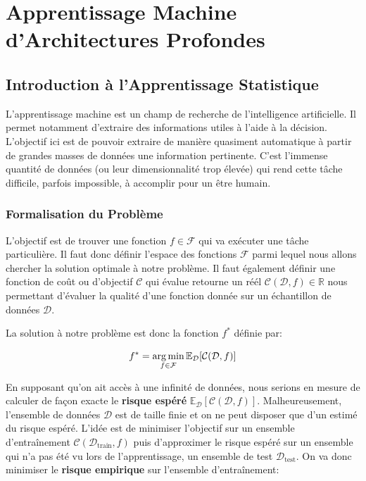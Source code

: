 \chapter{Apprentissage Machine d'Architectures Profondes}


\section{Introduction à l'Apprentissage Statistique}

L'apprentissage machine est un champ de recherche de l'intelligence
artificielle. Il permet notamment d'extraire des informations utiles à l'aide à
la décision.  L'objectif ici est de pouvoir extraire de manière quasiment
automatique à partir de grandes masses de données une information pertinente.
C'est l'immense quantité de données (ou leur dimensionnalité trop élevée)  qui
rend cette tâche difficile, parfois impossible, à accomplir pour un être
humain.


\subsection{Formalisation du Problème}

L'objectif est de trouver une fonction $f\in\mathcal{F}$ qui va exécuter une
tâche particulière. Il faut donc définir l'espace des fonctions $\mathcal{F}$
parmi lequel nous allons chercher la solution optimale à notre problème.  Il
faut également définir une fonction de coût ou d'objectif $\mathcal{C}$ qui
évalue retourne un réél $\mathcal{C}(\mathcal{D},f)\in\mathbb{R}$ nous
permettant d'évaluer la qualité d'une fonction donnée sur un échantillon de
données $\mathcal{D}$.

La solution à notre problème est donc la fonction $f^*$ définie par:

\begin{equation}
\label{eq:graal}
f^* = \operatorname*{arg\,min}_{f \in \mathcal{F}} {\mathbb E}_\mathcal{D}[\mathcal{C}(\mathcal{D},f)]
\end{equation}


En supposant qu'on ait accès à une infinité de données, nous serions en mesure
de calculer de façon exacte le {\bf risque espéré} ${\mathbb
E}_\mathcal{D}[\mathcal{C}(\mathcal{D},f)]$. Malheureusement, l'ensemble de
données $\mathcal{D}$ est de taille finie et on ne peut disposer que d'un estimé
du risque espéré. L'idée est de minimiser l'objectif sur un ensemble d'entraînement
$\mathcal{C}(\mathcal{D}_\textrm{train},f)$ puis d'approximer le risque espéré sur un ensemble
qui n'a pas été vu lors de l'apprentissage, un ensemble de test
$\mathcal{D}_\textrm{test}$. On va donc minimiser le {\bf risque empirique} sur
l'ensemble d'entraînement:

